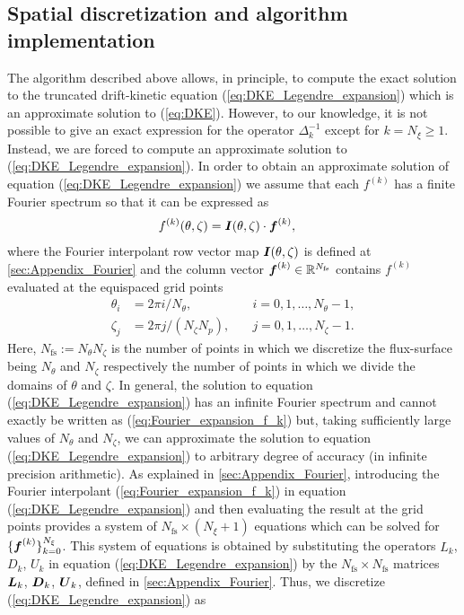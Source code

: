 \documentclass[10pt]{iopart}
\begin{document}
\subsection{Spatial discretization and algorithm implementation}\label{subsec:Algorithm_Implementation}
The algorithm described above allows, in principle, to compute the exact solution to the truncated drift-kinetic equation (\ref{eq:DKE_Legendre_expansion}) which is an approximate solution to (\ref{eq:DKE}). However, to our knowledge, it is not possible to give an exact expression for the operator $\Delta_k^{-1}$ except for $k=N_\xi \ge 1$. Instead, we are forced to compute an approximate solution to (\ref{eq:DKE_Legendre_expansion}).
In order to obtain an approximate solution of equation (\ref{eq:DKE_Legendre_expansion}) we assume that each $f^{(k)}$ has a finite Fourier spectrum so that it can be expressed as
\begin{align}	
	f^{(k)}(\theta,\zeta)
	& 
	=
	\vb*{I}(\theta,\zeta)
	\cdot
	\vb*{f}^{(k)},
	\label{eq:Fourier_expansion_f_k}
\end{align}
where the Fourier interpolant row vector map $\vb*{I}(\theta,\zeta)$ is defined at \ref{sec:Appendix_Fourier} and the column vector $\vb*{f}^{(k)}\in\mathbb{R}^{N_{\text{fs}}}$
contains $f^{(k)}$ evaluated at the equispaced grid points
%
\begin{align}
	\theta_i & = 2\pi i / N_\theta, \quad & i=0,1,\ldots, N_\theta-1,  \label{eq:Theta_grid}
	\\ 
	\zeta_j & = 2\pi j / (N_\zeta N_p), \quad & j=0,1,\ldots, N_\zeta-1. \label{eq:Zeta_grid}
\end{align}
Here, $N_{\text{fs}}:=N_\theta N_\zeta$ is the number of points in which we discretize the flux-surface being $N_\theta$ and $N_\zeta$ respectively the number of points in which we divide the domains of $\theta$ and $\zeta$. In general, the solution to equation (\ref{eq:DKE_Legendre_expansion}) has an infinite Fourier spectrum and cannot exactly be written as (\ref{eq:Fourier_expansion_f_k}) but, taking sufficiently large values of $N_\theta$ and $N_\zeta$, we can approximate the solution to equation (\ref{eq:DKE_Legendre_expansion}) to arbitrary degree of accuracy (in infinite precision arithmetic). As explained in \ref{sec:Appendix_Fourier}, introducing the Fourier interpolant (\ref{eq:Fourier_expansion_f_k}) in equation (\ref{eq:DKE_Legendre_expansion}) and then evaluating the result at the grid points provides a system of $N_{\text{fs}}\times(N_\xi+1)$ equations which can be solved for $\{\vb*{f}^{(k)}\}_{k=0}^{N_\xi}$. This system of equations is obtained by substituting the operators $L_k$, $D_k$, $U_k$ in equation (\ref{eq:DKE_Legendre_expansion}) by the $N_{\text{fs}}\times N_{\text{fs}}$ matrices $\vb*{L}_k$, $\vb*{D}_k$, $\vb*{U}_k$, defined in \ref{sec:Appendix_Fourier}. Thus, we discretize (\ref{eq:DKE_Legendre_expansion}) as %
\end{document}
